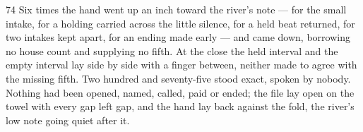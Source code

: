 \begin{CRchronicle}{74}
Six times the hand went up an inch toward the river’s note --- for the small intake, for a holding carried across the little silence, for a held beat returned, for two intakes kept apart, for an ending made early --- and came down, borrowing no house count and supplying no fifth. At the close the held interval and the empty interval lay side by side with a finger between, neither made to agree with the missing fifth. Two hundred and seventy-five stood exact, spoken by nobody. Nothing had been opened, named, called, paid or ended; the file lay open on the towel with every gap left gap, and the hand lay back against the fold, the river’s low note going quiet after it.
\end{CRchronicle}
